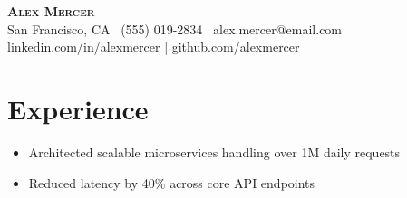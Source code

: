 \documentclass[letterpaper,11pt]{article}
\begin{document}
\begin{center}
  \textbf{\huge \scshape Alex Mercer}\\
  San Francisco, CA \ (555) 019-2834 \ alex.mercer@email.com\\
  \small linkedin.com/in/alexmercer | github.com/alexmercer
\end{center}

\section{Experience}
\begin{itemize}[leftmargin=0.15in, label={}]
  \item Architected scalable microservices handling over 1M daily requests\\
  \item Reduced latency by 40\% across core API endpoints
\end{itemize}
\end{document}
